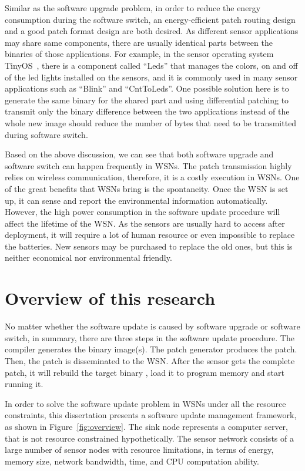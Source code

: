 Similar as the software upgrade problem, in order to reduce the energy consumption during the software switch, an energy-efficient patch routing design and a good patch format design are both desired. 
As different sensor applications may share same components, there are usually identical parts between the binaries of those applications. For example, in the sensor operating system TinyOS~\cite{tinyos}, there is a component called ``Leds'' that manages the colors, on and off of the led lights installed on the sensors, and it is commonly used in many sensor applications such as ``Blink'' and ``CntToLeds''. 
One possible solution here is to generate the same binary for the shared part and using differential patching to transmit only the binary difference between the two applications instead of the whole new image should reduce the number of bytes that need to be transmitted during software switch.

Based on the above discussion, we can see that both software upgrade and software switch can happen frequently in WSNs. The patch transmission highly relies on wireless communication, therefore, it is a costly execution in WSNs.
One of the great benefits that WSNs bring is the spontaneity. Once the WSN is set up, it can sense and report
the environmental information automatically.
However, the high power consumption in the software update procedure will affect the lifetime of the WSN.
As the sensors are usually hard to access after deployment, it will require a lot of human resource or even impossible to replace the batteries. New sensors may be purchased to replace the old ones, but this is neither economical nor environmental friendly.

\section{Overview of this research}

No matter whether the software update is caused by software upgrade or software switch, in summary, there are three steps in the software update procedure.
The compiler generates the binary image(s).
The patch generator produces the patch.
Then, the patch is disseminated to the WSN. After the sensor gets the complete patch, it will rebuild the target binary , load it to program memory and start running it.

In order to solve the software update problem in WSNs under all the resource constraints, this dissertation presents a software update management framework, as shown in Figure~\ref{fig:overview}. 
The sink node represents a computer server, that is not resource constrained hypothetically. The sensor network consists of a large number of sensor nodes with resource limitations, in terms of energy, memory size,  network bandwidth, time, and CPU computation ability.

